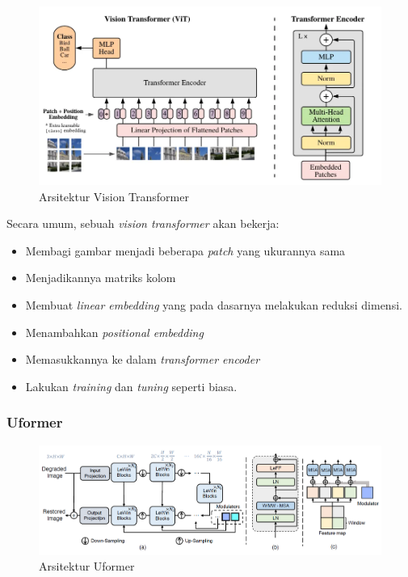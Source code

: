 \documentclass[11pt, a4paper, final]{report}
\begin{document}
\begin{figure}[H]
\centering
\includegraphics[scale=0.5]{assets/ViT.png}
\caption{Arsitektur Vision Transformer \cite{dosovitskiy2021image}}
\end{figure}

Secara umum, sebuah \textit{vision transformer} akan bekerja:
\begin{itemize}[noitemsep]
    \item Membagi gambar menjadi beberapa \textit{patch} yang ukurannya sama
    \item Menjadikannya matriks kolom
    \item Membuat \textit{linear embedding} yang pada dasarnya melakukan reduksi dimensi.
    \item Menambahkan \textit{positional embedding}
    \item Memasukkannya ke dalam \textit{transformer encoder}
    \item Lakukan \textit{training} dan \textit{tuning} seperti biasa.
\end{itemize}

\subsubsection{Uformer}


\begin{figure}[H]
\centering
\includegraphics[scale=0.5]{assets/Uformer.png}
\caption{Arsitektur Uformer \cite{dosovitskiy2021image}}
\end{figure}
\end{document}
